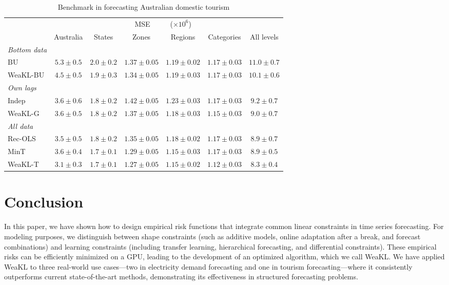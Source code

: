 \begin{table}[H]
\centering
\caption{Benchmark in forecasting Australian domestic tourism} 
\begin{tabular}{lcccccc}
\toprule
 &  & &$\;$\hfill  MSE  & ($\times 10^6$) \hfill $\;$&   &  \\
 \cmidrule{2-7}%
 & Australia & States & Zones & Regions & Categories & All levels \\
\midrule
\textit{Bottom data} &&&&&&\\
BU & $5.3\!\pm\!0.5$ & $2.0\!\pm\!0.2$ & $1.37\!\pm\!0.05$ & $\mathbf{1.19\!\pm\!0.02}$ & $\mathbf{1.17\!\pm\!0.03}$ & $11.0\!\pm\!0.7$ \\
WeaKL-BU & $\mathbf{4.5\!\pm\!0.5}$ & $\mathbf{1.9\!\pm\!0.3}$ & $\mathbf{1.34\!\pm\!0.05}$ & $\mathbf{1.19\!\pm\!0.03}$ & $\mathbf{1.17\!\pm\!0.03}$ & $\mathbf{10.1\!\pm\!0.6}$ \\
\midrule
\textit{Own lags} &&&&&&\\
Indep & $3.6\!\pm\!0.6$ & $1.8\!\pm\!0.2$ & $1.42\!\pm\!0.05$ & $1.23\!\pm\!0.03$ & $1.17\!\pm\!0.03$ & $9.2\!\pm\!0.7$ \\
WeaKL-G & $\mathbf{3.6\!\pm\!0.5}$ & $\mathbf{1.8\!\pm\!0.2}$ & $\mathbf{1.37\!\pm\!0.05}$ & $\mathbf{1.18\!\pm\!0.03}$ & $\mathbf{1.15\!\pm\!0.03}$ & $\mathbf{9.0\!\pm\!0.7}$ \\
\midrule
\textit{All data} &&&&&&\\
Rec-OLS & $3.5\!\pm\!0.5$ & $1.8\!\pm\!0.2$ & $1.35\!\pm\!0.05$ & $1.18\!\pm\!0.02$ & $1.17\!\pm\!0.03$ & $8.9\!\pm\!0.7$ \\
MinT & $3.6\!\pm\!0.4$ & $1.7\!\pm\!0.1$ & $1.29\!\pm\!0.05$ & $\mathbf{1.15\!\pm\!0.03}$ & $1.17\!\pm\!0.03$ & $8.9\!\pm\!0.5$ \\
WeaKL-T & $\mathbf{3.1\!\pm\!0.3}$ & $\mathbf{1.7\!\pm\!0.1}$ & $\mathbf{1.27\!\pm\!0.05}$ & $\mathbf{1.15\!\pm\!0.02}$ & $\mathbf{1.12\!\pm\!0.03}$ & $\mathbf{8.3\!\pm\!0.4}$ \\
\bottomrule
\end{tabular}
\label{table_australia}
\end{table}

\section{Conclusion}

In this paper, we have shown how to design empirical risk functions that integrate common linear constraints in time series forecasting. For modeling purposes, we distinguish between shape constraints (such as additive models, online adaptation after a break, and forecast combinations) and learning constraints (including transfer learning, hierarchical forecasting, and differential constraints). 
These empirical risks can be efficiently minimized on a GPU, leading to the development of an optimized algorithm, which we call WeaKL. 
We have applied WeaKL to three real-world use cases---two in electricity demand forecasting and one in tourism forecasting---where it consistently outperforms current state-of-the-art methods, demonstrating its effectiveness in structured forecasting problems.

